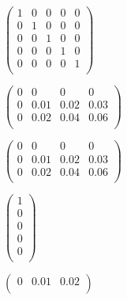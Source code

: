 \documentclass[11pt,a4paper]{article}
\author{Martin Wille}
\begin{document}
$\left( \begin{array}{ccccc}
1&0&0&0&0\\
0&1&0&0&0\\
0&0&1&0&0\\
0&0&0&1&0\\
0&0&0&0&1\\
\end{array} \right)$

$\left( \begin{array}{rrrr}
0&0&0&0\\
0&0.01&0.02&0.03\\
0&0.02&0.04&0.06\\
\end{array} \right)$

$\left( \begin{array}{llll}
0&0&0&0\\
0&0.01&0.02&0.03\\
0&0.02&0.04&0.06\\
\end{array} \right)$

$\left( \begin{array}{c}
1\\
0\\
0\\
0\\
0\\
\end{array} \right)$

$\left( \begin{array}{ccc}
0&0.01&0.02\\
\end{array} \right)$
\end{document}
